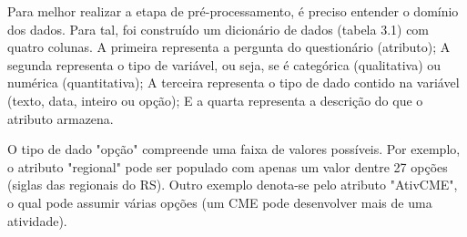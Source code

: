 \documentclass[tg]{mdtufsm}
\begin{document}
Para melhor realizar a etapa de pré-processamento, é preciso entender o domínio dos dados. Para tal, foi construído um dicionário de dados (tabela 3.1) com quatro colunas. A primeira representa a pergunta do questionário (atributo); A segunda representa o tipo de variável, ou seja, se é categórica (qualitativa) ou numérica (quantitativa); A terceira representa o tipo de dado contido na variável (texto, data, inteiro ou opção); E a quarta representa a descrição do que o atributo armazena. 

O tipo de dado "opção" compreende uma faixa de valores possíveis. Por exemplo, o atributo "regional" pode ser populado com apenas um valor dentre 27 opções (siglas das regionais do RS). Outro exemplo denota-se pelo atributo "AtivCME", o qual pode assumir várias opções (um CME pode desenvolver mais de uma atividade). 
\end{document}
